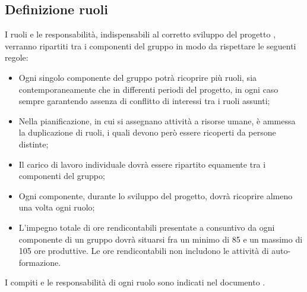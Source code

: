 \documentclass[../PianoDiProgetto.tex]{subfiles}
\begin{document}
		\subsection{Definizione ruoli}
			I ruoli e le responsabilità, indispensabili al corretto sviluppo del progetto \progetto ,  verranno ripartiti tra i componenti del gruppo in modo da rispettare le seguenti regole:
			\begin{itemize}
			\item Ogni singolo componente del gruppo potrà ricoprire più ruoli, sia contemporaneamente che in differenti periodi del progetto, in ogni caso sempre garantendo assenza di conflitto di interessi tra i ruoli assunti;
			\item Nella pianificazione, in cui si assegnano attività a risorse umane, è ammessa la duplicazione di ruoli, i quali devono però essere ricoperti da persone distinte;
			\item Il carico di lavoro individuale dovrà essere ripartito equamente tra i componenti del gruppo;
			\item Ogni componente, durante lo sviluppo del progetto, dovrà ricoprire almeno una volta ogni ruolo;
			\item L'impegno totale di ore rendicontabili presentate a consuntivo da ogni componente di un gruppo dovrà situarsi fra un minimo di 85 e un massimo di 105 ore produttive. Le ore rendicontabili non includono le attività di auto-formazione.
			\end{itemize}
			I compiti e le responsabilità di ogni ruolo sono indicati nel documento \normediprogettov.
		
\end{document}
